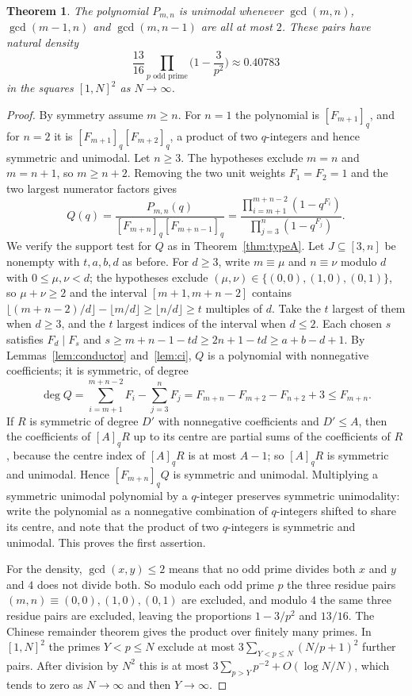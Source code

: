 \documentclass[11pt,a4paper]{article}
\newtheorem{theorem}{Theorem}[section]
\theoremstyle{definition}\newtheorem{definition}[theorem]{Definition}
\theoremstyle{remark}\newtheorem{remark}[theorem]{Remark}\newtheorem{example}[theorem]{Example}
\numberwithin{equation}{section}
\begin{document}
\begin{theorem}\label{thm:density}
The polynomial $P_{m,n}$ is unimodal whenever $\gcd(m,n)$, $\gcd(m-1,n)$ and $\gcd(m,n-1)$ are all at most $2$. These pairs have natural density
\[
 \frac{13}{16}\prod_{p\text{ odd prime}}\Big(1-\frac3{p^2}\Big)\approx0.40783
\]
in the squares $[1,N]^2$ as $N\to\infty$.
\end{theorem}
\begin{proof}
By symmetry assume $m\ge n$. For $n=1$ the polynomial is $[F_{m+1}]_q$, and for $n=2$ it is $[F_{m+1}]_q[F_{m+2}]_q$, a product of two $q$-integers and hence symmetric and unimodal. Let $n\ge3$. The hypotheses exclude $m=n$ and $m=n+1$, so $m\ge n+2$. Removing the two unit weights $F_1=F_2=1$ and the two largest numerator factors gives
\[
 Q(q)=\frac{P_{m,n}(q)}{[F_{m+n}]_q[F_{m+n-1}]_q}=\frac{\prod_{i=m+1}^{m+n-2}(1-q^{F_i})}{\prod_{j=3}^{n}(1-q^{F_j})}.
\]
We verify the support test for $Q$ as in Theorem~\ref{thm:typeA}. Let $J\subseteq[3,n]$ be nonempty with $t,a,b,d$ as before. For $d\ge3$, write $m\equiv\mu$ and $n\equiv\nu$ modulo $d$ with $0\le\mu,\nu<d$; the hypotheses exclude $(\mu,\nu)\in\{(0,0),(1,0),(0,1)\}$, so $\mu+\nu\ge2$ and the interval $[m+1,m+n-2]$ contains $\lfloor(m+n-2)/d\rfloor-\lfloor m/d\rfloor\ge\lfloor n/d\rfloor\ge t$ multiples of $d$. Take the $t$ largest of them when $d\ge3$, and the $t$ largest indices of the interval when $d\le2$. Each chosen $s$ satisfies $F_d\mid F_s$ and $s\ge m+n-1-td\ge 2n+1-td\ge a+b-d+1$. By Lemmas~\ref{lem:conductor} and~\ref{lem:ci}, $Q$ is a polynomial with nonnegative coefficients; it is symmetric, of degree
\[
 \deg Q=\sum_{i=m+1}^{m+n-2}F_i-\sum_{j=3}^nF_j=F_{m+n}-F_{m+2}-F_{n+2}+3\le F_{m+n}.
\]
If $R$ is symmetric of degree $D'$ with nonnegative coefficients and $D'\le A$, then the coefficients of $[A]_qR$ up to its centre are partial sums of the coefficients of $R$, because the centre index of $[A]_qR$ is at most $A-1$; so $[A]_qR$ is symmetric and unimodal. Hence $[F_{m+n}]_qQ$ is symmetric and unimodal. Multiplying a symmetric unimodal polynomial by a $q$-integer preserves symmetric unimodality: write the polynomial as a nonnegative combination of $q$-integers shifted to share its centre, and note that the product of two $q$-integers is symmetric and unimodal. This proves the first assertion.

For the density, $\gcd(x,y)\le2$ means that no odd prime divides both $x$ and $y$ and $4$ does not divide both. So modulo each odd prime $p$ the three residue pairs $(m,n)\equiv(0,0),(1,0),(0,1)$ are excluded, and modulo $4$ the same three residue pairs are excluded, leaving the proportions $1-3/p^2$ and $13/16$. The Chinese remainder theorem gives the product over finitely many primes. In $[1,N]^2$ the primes $Y<p\le N$ exclude at most $3\sum_{Y<p\le N}(N/p+1)^2$ further pairs. After division by $N^2$ this is at most $3\sum_{p>Y}p^{-2}+O(\log N/N)$, which tends to zero as $N\to\infty$ and then $Y\to\infty$.
\end{proof}
\end{document}
